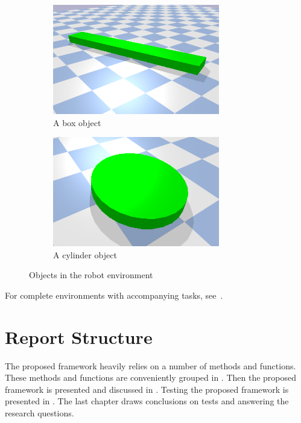 \begin{figure}[H]
    \centering
    \begin{subfigure}{.5\textwidth}
    \centering
    \includegraphics[width=0.8\textwidth]{figures/introduction/box_object.png}
    \caption{A box object}
    \end{subfigure}%
    \begin{subfigure}{.5\textwidth}
    \centering
    \includegraphics[width=0.8\textwidth]{figures/introduction/cylinder_object.png}
    \caption{A cylinder object}
    \end{subfigure}%
    \caption{Objects in the robot environment}%
    \label{fig:example_objects}
\end{figure}

For complete environments with accompanying tasks, see~.\bs

\section{Report Structure}%
\label{sec:report_structure}
The proposed framework heavily relies on a number of methods and functions. These methods and functions are conveniently grouped in . Then the proposed framework is presented and discussed in . Testing the proposed framework is presented in . The last chapter draws conclusions on tests and answering the research questions.\bs
